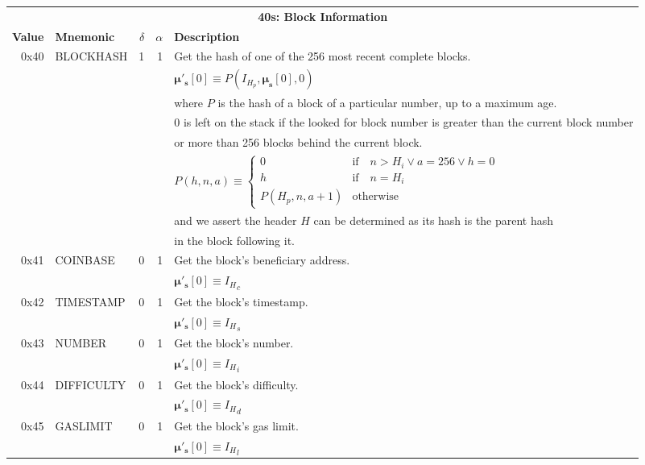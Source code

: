 \documentclass[9pt,oneside]{amsart}
\begin{document}
\begin{tabular*}{\columnwidth}[h]{rlrrl}
\toprule
\multicolumn{5}{c}{\textbf{40s: Block Information}} \vspace{5pt} \\
\textbf{Value} & \textbf{Mnemonic} & $\delta$ & $\alpha$ & \textbf{Description} \vspace{5pt} \\
0x40 & {\small BLOCKHASH} & 1 & 1 & Get the hash of one of the 256 most recent complete blocks. \\
&&&& $\boldsymbol{\mu}'_\mathbf{s}[0] \equiv P(I_{H_p}, \boldsymbol{\mu}_\mathbf{s}[0], 0)$ \\
&&&& where $P$ is the hash of a block of a particular number, up to a maximum age.\\
&&&& 0 is left on the stack if the looked for block number is greater than the current block number \\
&&&& or more than 256 blocks behind the current block. \\
&&&& $P(h, n, a) \equiv \begin{cases} 0 & \text{if} \quad n > H_i \vee a = 256 \vee h = 0 \\ h & \text{if} \quad n = H_i \\ P(H_p, n, a + 1) & \text{otherwise} \end{cases}$ \\
&&&& and we assert the header $H$ can be determined as its hash is the parent hash \\
&&&& in the block following it. \\
\midrule
0x41 & {\small COINBASE} & 0 & 1 & Get the block's beneficiary address. \\
&&&& $\boldsymbol{\mu}'_\mathbf{s}[0] \equiv {I_H}_c$ \\
\midrule
0x42 & {\small TIMESTAMP} & 0 & 1 & Get the block's timestamp. \\
&&&& $\boldsymbol{\mu}'_\mathbf{s}[0] \equiv {I_H}_s$ \\
\midrule
0x43 & {\small NUMBER} & 0 & 1 & Get the block's number. \\
&&&& $\boldsymbol{\mu}'_\mathbf{s}[0] \equiv {I_H}_i$ \\
\midrule
0x44 & {\small DIFFICULTY} & 0 & 1 & Get the block's difficulty. \\
&&&& $\boldsymbol{\mu}'_\mathbf{s}[0] \equiv {I_H}_d$ \\
\midrule
0x45 & {\small GASLIMIT} & 0 & 1 & Get the block's gas limit. \\
&&&& $\boldsymbol{\mu}'_\mathbf{s}[0] \equiv {I_H}_l$ \\
\bottomrule
\end{tabular*}
\end{document}
